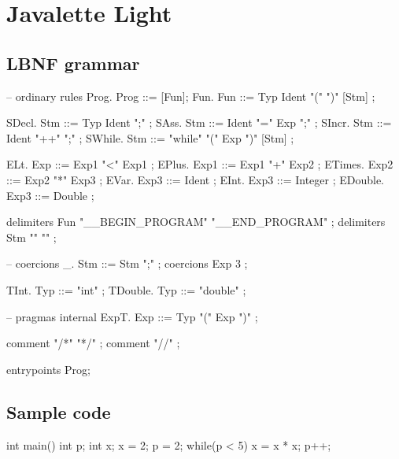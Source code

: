 \documentclass[a4paper,12pt,notitlepage]{report}
\begin{document}
%
%




%
%

\appendix
\chapter{Javalette Light}

\section{LBNF grammar}
\begin{code}
-- ordinary rules
Prog.     Prog     ::= [Fun];
Fun.      Fun      ::= Typ Ident "(" ")"  [Stm] ;

SDecl.    Stm      ::= Typ Ident ";"  ;
SAss.     Stm      ::= Ident "=" Exp ";"  ;
SIncr.    Stm      ::= Ident "++" ";"  ;
SWhile.   Stm      ::= "while" "(" Exp ")" [Stm]  ;

ELt.      Exp      ::= Exp1 "<" Exp1 ;
EPlus.    Exp1     ::= Exp1 "+" Exp2 ;
ETimes.   Exp2     ::= Exp2 "*" Exp3 ;
EVar.     Exp3     ::= Ident ;
EInt.     Exp3     ::= Integer ;
EDouble.  Exp3     ::= Double ;

delimiters Fun "__BEGIN_PROGRAM" "__END_PROGRAM" ;
delimiters Stm "{" "}" ;

-- coercions
_.        Stm      ::= Stm ";" ;
coercions Exp 3 ;

TInt.     Typ  ::= "int" ;
TDouble.  Typ  ::= "double" ;

-- pragmas
internal ExpT. Exp ::= Typ "(" Exp ")" ;

comment "/*" "*/" ;
comment "//" ;

entrypoints Prog;
\end{code}

\newpage
\section{Sample code}
\begin{code}
int main() {
    int p;
    int x;
    x = 2;
    p = 2;
    while(p < 5) {
        x = x * x;
        p++;
    }
}
\end{code}
\end{document}
